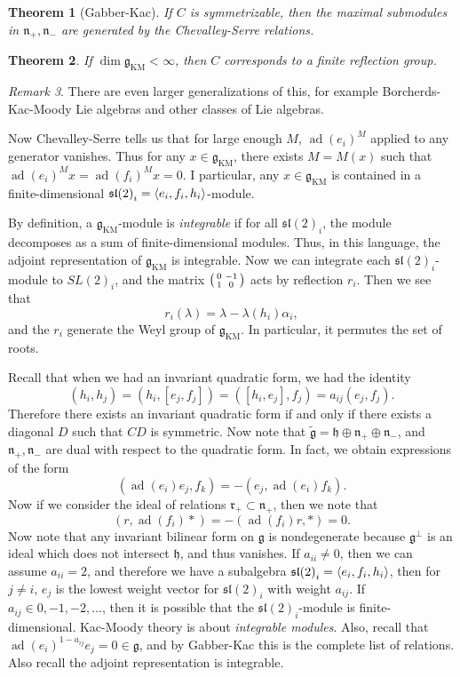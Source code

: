 \documentclass[leqno, openany]{memoir}
\newtheorem{thm}{Theorem}[section]
\theoremstyle{definition}
\theoremstyle{remark}
\newtheorem{rmk}[thm]{Remark}
\theoremstyle{plain}
\theoremstyle{definition}
\theoremstyle{remark}
\newcommand{\mf}[1]{\mathfrak{#1}}
\newcommand{\mr}[1]{\mathrm{#1}}
\newcommand{\wtl}[1]{\widetilde{#1}}
\DeclareMathOperator{\ad}{ad}
\begin{document}
\begin{thm}[Gabber-Kac]
    If $C$ is symmetrizable, then the maximal submodules in $\mf{n}_+, \mf{n}_-$ are generated by the Chevalley-Serre relations.
\end{thm}

\begin{thm}
    If $\dim \mf{g}_{\mr{KM}} < \infty$, then $C$ corresponds to a finite reflection group.
\end{thm}

\begin{rmk}
    There are even larger generalizations of this, for example Borcherds-Kac-Moody Lie algebras and other classes of Lie algebras. 
\end{rmk}

Now Chevalley-Serre tells us that for large enough $M$, ${\ad(e_i)}^M$ applied to any generator vanishes. Thus for any $x \in \mf{g}_{\mr{KM}}$, there exists $M = M(x)$ such that ${\ad(e_i)}^M x = {\ad(f_i)}^M x = 0$. I particular, any $x \in \mf{g}_{\mr{KM}}$ is contained in a finite-dimensional ${\mf{sl}(2)}_i = \ev{e_i, f_i, h_i}$-module.

By definition, a $\mf{g}_{\mr{KM}}$-module is \textit{integrable} if for all ${\mf{sl}(2)}_i$, the module decomposes as a sum of finite-dimensional modules. Thus, in this language, the adjoint representation of $\mf{g}_{\mr{KM}}$ is integrable. Now we can integrate each ${\mf{sl}(2)}_i$-module to ${SL(2)}_i$, and the matrix $\begin{psmallmatrix} 0 & -1 \\ 1 & 0 \end{psmallmatrix}$ acts by reflection $r_i$. Then we see that 
\[ r_i(\lambda) = \lambda - \lambda(h_i) \alpha_i, \]
and the $r_i$ generate the Weyl group of $\mf{g}_{\mr{KM}}$. In particular, it permutes the set of roots.

Recall that when we had an invariant quadratic form, we had the identity
\[ (h_i, h_j) = (h_i, [e_j, f_j]) = ([h_i, e_j], f_j) = a_{ij} (e_j, f_j). \]
Therefore there exists an invariant quadratic form if and only if there exists a diagonal $D$ such that $CD$ is symmetric. Now note that $\wtl{ \mf{g} } = \mf{h} \oplus \mf{n}_+ \oplus \mf{n}_-$, and $\mf{n}_+, \mf{n}_-$ are dual with respect to the quadratic form. In fact, we obtain expressions of the form
\[ ( \ad(e_i) e_j, f_k ) = - (e_j, \ad(e_i) f_k). \]
Now if we consider the ideal of relations $\mf{r}_+ \subset \mf{n}_+$, then we note that
\[ (r, \ad(f_i) *) = - (\ad(f_i) r, *) = 0. \]
Now note that any invariant bilinear form on $\mf{g}$ is nondegenerate because $\mf{g}^{\perp}$ is an ideal which does not intersect $\mf{h}$, and thus vanishes. If $a_{ii} \neq 0$, then we can assume $a_{ii} = 2$, and therefore we have a subalgebra ${\mf{sl}(2)}_i = \ev{e_i, f_i, h_i}$, then for $j \neq i$, $e_j$ is the lowest weight vector for ${\mf{sl}(2)}_i$ with weight $a_{ij}$. If $a_{ij} \in 0,-1,-2,\ldots$, then it is possible that the ${\mf{sl}(2)}_i$-module is finite-dimensional. Kac-Moody theory is about \textit{integrable modules}. Also, recall that ${\ad(e_i)}^{1-a_{ij}} e_j = 0 \in \mf{g}$, and by Gabber-Kac this is the complete list of relations. Also recall the adjoint representation is integrable.
\end{document}
